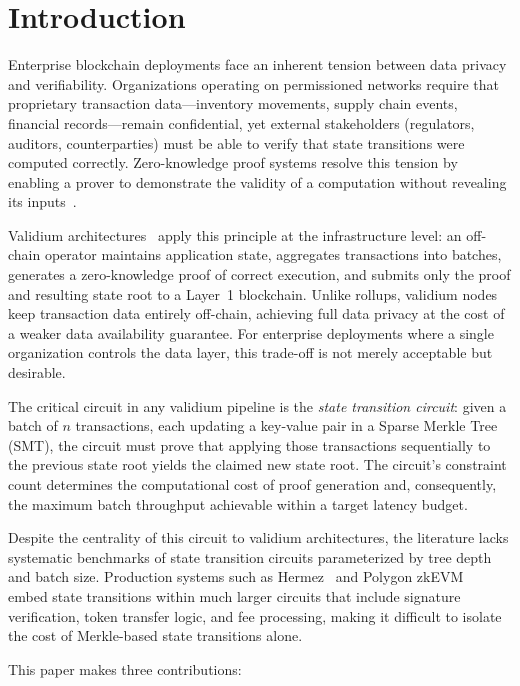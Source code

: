 \section{Introduction}

Enterprise blockchain deployments face an inherent tension between
data privacy and verifiability. Organizations operating on permissioned
networks require that proprietary transaction data---inventory movements,
supply chain events, financial records---remain confidential, yet
external stakeholders (regulators, auditors, counterparties) must be
able to verify that state transitions were computed correctly. Zero-knowledge
proof systems resolve this tension by enabling a prover to demonstrate
the validity of a computation without revealing its inputs~\cite{groth2016size}.

Validium architectures~\cite{buterin2022zkevmtypes} apply this principle
at the infrastructure level: an off-chain operator maintains application
state, aggregates transactions into batches, generates a zero-knowledge
proof of correct execution, and submits only the proof and resulting
state root to a Layer~1 blockchain. Unlike rollups, validium nodes keep
transaction data entirely off-chain, achieving full data privacy at the
cost of a weaker data availability guarantee. For enterprise deployments
where a single organization controls the data layer, this trade-off is
not merely acceptable but desirable.

The critical circuit in any validium pipeline is the \emph{state transition
circuit}: given a batch of $n$ transactions, each updating a key-value
pair in a Sparse Merkle Tree (SMT), the circuit must prove that applying
those transactions sequentially to the previous state root yields the
claimed new state root. The circuit's constraint count determines the
computational cost of proof generation and, consequently, the maximum
batch throughput achievable within a target latency budget.

Despite the centrality of this circuit to validium architectures, the
literature lacks systematic benchmarks of state transition circuits
parameterized by tree depth and batch size. Production systems such as
Hermez~\cite{hermez2021circuits} and Polygon zkEVM~\cite{polygon2024zkevm}
embed state transitions within much larger circuits that include signature
verification, token transfer logic, and fee processing, making it
difficult to isolate the cost of Merkle-based state transitions alone.

This paper makes three contributions:


